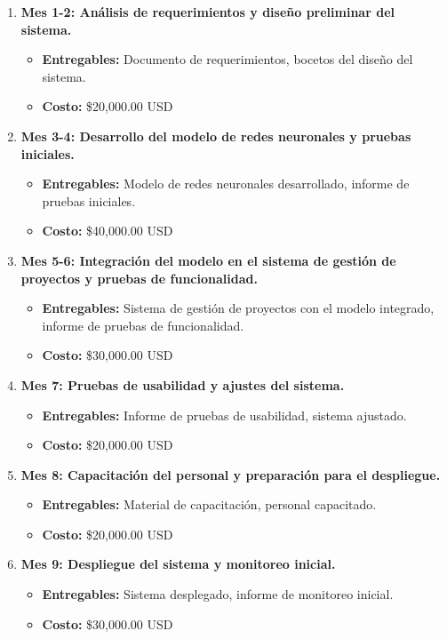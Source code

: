 \documentclass{article}
\begin{document}
   
    \begin{enumerate}
        \item \textbf{Mes 1-2: Análisis de requerimientos y diseño preliminar del sistema.}
        \begin{itemize}
            \item \textbf{Entregables:} Documento de requerimientos, bocetos del diseño del sistema.
            \item \textbf{Costo:} \$20,000.00 USD
        \end{itemize}
        \item \textbf{Mes 3-4: Desarrollo del modelo de redes neuronales y pruebas iniciales.}
        \begin{itemize}
            \item \textbf{Entregables:} Modelo de redes neuronales desarrollado, informe de pruebas iniciales.
            \item \textbf{Costo:} \$40,000.00 USD
        \end{itemize}
        \item \textbf{Mes 5-6: Integración del modelo en el sistema de gestión de proyectos y pruebas de funcionalidad.}
        \begin{itemize}
            \item \textbf{Entregables:} Sistema de gestión de proyectos con el modelo integrado, informe de pruebas de funcionalidad.
            \item \textbf{Costo:} \$30,000.00 USD
        \end{itemize}
        \item \textbf{Mes 7: Pruebas de usabilidad y ajustes del sistema.}
        \begin{itemize}
            \item \textbf{Entregables:} Informe de pruebas de usabilidad, sistema ajustado.
            \item \textbf{Costo:} \$20,000.00 USD
        \end{itemize}
        \item \textbf{Mes 8: Capacitación del personal y preparación para el despliegue.}
        \begin{itemize}
            \item \textbf{Entregables:} Material de capacitación, personal capacitado.
            \item \textbf{Costo:} \$20,000.00 USD
        \end{itemize}
        \item \textbf{Mes 9: Despliegue del sistema y monitoreo inicial.}
        \begin{itemize}
            \item \textbf{Entregables:} Sistema desplegado, informe de monitoreo inicial.
            \item \textbf{Costo:} \$30,000.00 USD
        \end{itemize}
    \end{enumerate}
\end{document}
